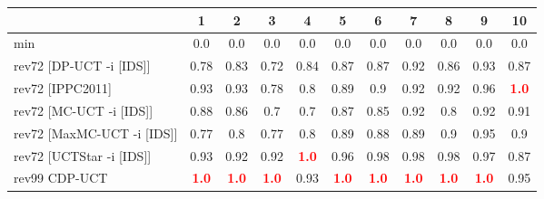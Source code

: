 \documentclass{article}
\begin{document}
\begin{tabular}{|l|r@{$\pm$}rr@{$\pm$}rr@{$\pm$}rr@{$\pm$}rr@{$\pm$}rr@{$\pm$}rr@{$\pm$}rr@{$\pm$}rr@{$\pm$}rr@{$\pm$}r|}
\hline

& \multicolumn{2}{c}{1}
& \multicolumn{2}{c}{2}
& \multicolumn{2}{c}{3}
& \multicolumn{2}{c}{4}
& \multicolumn{2}{c}{5}
& \multicolumn{2}{c}{6}
& \multicolumn{2}{c}{7}
& \multicolumn{2}{c}{8}
& \multicolumn{2}{c}{9}
& \multicolumn{2}{c|}{10}
\\
\hline
\hline
min
& \multicolumn{2}{c}{0.0}
& \multicolumn{2}{c}{0.0}
& \multicolumn{2}{c}{0.0}
& \multicolumn{2}{c}{0.0}
& \multicolumn{2}{c}{0.0}
& \multicolumn{2}{c}{0.0}
& \multicolumn{2}{c}{0.0}
& \multicolumn{2}{c}{0.0}
& \multicolumn{2}{c}{0.0}
& \multicolumn{2}{c|}{0.0}
\\
rev72 [DP-UCT -i [IDS]]
& \multicolumn{2}{c}{0.78}
& \multicolumn{2}{c}{0.83}
& \multicolumn{2}{c}{0.72}
& \multicolumn{2}{c}{0.84}
& \multicolumn{2}{c}{0.87}
& \multicolumn{2}{c}{0.87}
& \multicolumn{2}{c}{0.92}
& \multicolumn{2}{c}{0.86}
& \multicolumn{2}{c}{0.93}
& \multicolumn{2}{c|}{0.87}
\\
rev72 [IPPC2011]
& \multicolumn{2}{c}{0.93}
& \multicolumn{2}{c}{0.93}
& \multicolumn{2}{c}{0.78}
& \multicolumn{2}{c}{0.8}
& \multicolumn{2}{c}{0.89}
& \multicolumn{2}{c}{0.9}
& \multicolumn{2}{c}{0.92}
& \multicolumn{2}{c}{0.92}
& \multicolumn{2}{c}{0.96}
& \multicolumn{2}{c|}{\textbf{\textcolor{red}{1.0}}}
\\
rev72 [MC-UCT -i [IDS]]
& \multicolumn{2}{c}{0.88}
& \multicolumn{2}{c}{0.86}
& \multicolumn{2}{c}{0.7}
& \multicolumn{2}{c}{0.7}
& \multicolumn{2}{c}{0.87}
& \multicolumn{2}{c}{0.85}
& \multicolumn{2}{c}{0.92}
& \multicolumn{2}{c}{0.8}
& \multicolumn{2}{c}{0.92}
& \multicolumn{2}{c|}{0.91}
\\
rev72 [MaxMC-UCT -i [IDS]]
& \multicolumn{2}{c}{0.77}
& \multicolumn{2}{c}{0.8}
& \multicolumn{2}{c}{0.77}
& \multicolumn{2}{c}{0.8}
& \multicolumn{2}{c}{0.89}
& \multicolumn{2}{c}{0.88}
& \multicolumn{2}{c}{0.89}
& \multicolumn{2}{c}{0.9}
& \multicolumn{2}{c}{0.95}
& \multicolumn{2}{c|}{0.9}
\\
rev72 [UCTStar -i [IDS]]
& \multicolumn{2}{c}{0.93}
& \multicolumn{2}{c}{0.92}
& \multicolumn{2}{c}{0.92}
& \multicolumn{2}{c}{\textbf{\textcolor{red}{1.0}}}
& \multicolumn{2}{c}{0.96}
& \multicolumn{2}{c}{0.98}
& \multicolumn{2}{c}{0.98}
& \multicolumn{2}{c}{0.98}
& \multicolumn{2}{c}{0.97}
& \multicolumn{2}{c|}{0.87}
\\
\hline
rev99 CDP-UCT
& \multicolumn{2}{c}{\textbf{\textcolor{red}{1.0}}}
& \multicolumn{2}{c}{\textbf{\textcolor{red}{1.0}}}
& \multicolumn{2}{c}{\textbf{\textcolor{red}{1.0}}}
& \multicolumn{2}{c}{0.93}
& \multicolumn{2}{c}{\textbf{\textcolor{red}{1.0}}}
& \multicolumn{2}{c}{\textbf{\textcolor{red}{1.0}}}
& \multicolumn{2}{c}{\textbf{\textcolor{red}{1.0}}}
& \multicolumn{2}{c}{\textbf{\textcolor{red}{1.0}}}
& \multicolumn{2}{c}{\textbf{\textcolor{red}{1.0}}}
& \multicolumn{2}{c|}{0.95}
\\
\hline
\end{tabular}%
\end{document}
